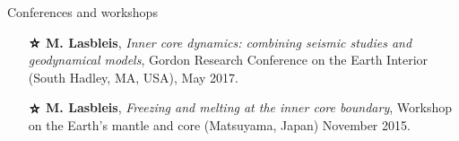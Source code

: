 \documentclass{cv}
\newcommand\openbigstar[1][0.4]{%
  \scalerel*{%
    \stackinset{c}{-.125pt}{c}{}{\scalebox{#1}{\color{white}{$\bigstar$}}}{%
      $\bigstar$}%
  }{\bigstar}
}
\begin{document}
\begin{rubrique}{Conferences and workshops}
\begin{itemize}[parsep=-2pt]
	\item[$\openbigstar$]  \textbf{M. Lasbleis}, \textit{Inner core dynamics: combining seismic studies and geodynamical models}, Gordon Research Conference on the Earth Interior  (South Hadley, MA, USA), May 2017. 
	\item[$\openbigstar$] \textbf{M. Lasbleis}, \textit{Freezing and melting at the inner core boundary}, Workshop on the Earth's mantle and core (Matsuyama, Japan) November 2015.

\end{itemize}
\end{rubrique}
\end{document}
